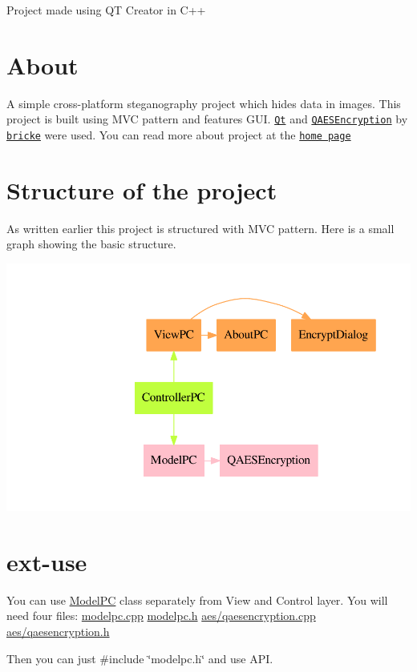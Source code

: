 Project made using QT Creator in C++\hypertarget{index_about}{}\section{About}\label{index_about}
A simple cross-\/platform steganography project which hides data in images. This project is built using M\+VC pattern and features G\+UI. \href{https://qt.io}{\tt Qt} and \href{https://github.com/bricke/Qt-AES}{\tt Q\+A\+E\+S\+Encryption} by \href{https://github.com/bricke}{\tt bricke} were used. You can read more about project at the \href{../}{\tt home page}\hypertarget{index_structure}{}\section{Structure of the project}\label{index_structure}
As written earlier this project is structured with M\+VC pattern. Here is a small graph showing the basic structure. 
\begin{DoxyImageNoCaption}
  \mbox{\includegraphics[width=\textwidth,height=\textheight/2,keepaspectratio=true]{dot_structure}}
\end{DoxyImageNoCaption}
\hypertarget{index_ext-use}{}\section{ext-\/use}\label{index_ext-use}
You can use \hyperlink{class_model_p_c}{Model\+PC} class separately from View and Control layer. You will need four files\+: \hyperlink{modelpc_8cpp}{modelpc.\+cpp} \hyperlink{modelpc_8h}{modelpc.\+h} \hyperlink{qaesencryption_8cpp}{aes/qaesencryption.\+cpp} \hyperlink{qaesencryption_8h}{aes/qaesencryption.\+h}

Then you can just {\ttfamily \#include \char`\"{}modelpc.\+h\char`\"{}} and use A\+PI.